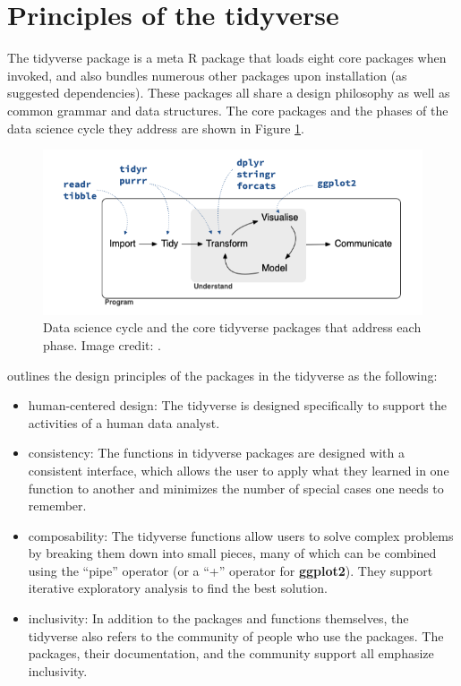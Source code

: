 \documentclass[12pt]{article}
\providecommand{\tightlist}{%
  \setlength{\itemsep}{0pt}\setlength{\parskip}{0pt}}
\begin{document}
\hypertarget{sec:principles}{%
\section{Principles of the tidyverse}\label{sec:principles}}

The tidyverse package is a meta R package that loads eight core packages
when invoked, and also bundles numerous other packages upon installation
(as suggested dependencies). These packages all share a design
philosophy as well as common grammar and data structures. The core
packages and the phases of the data science cycle they address are shown
in Figure \ref{fig:data-science-cycle}.

\linespread{1}
\begin{figure}

{\centering \includegraphics[width=0.8\linewidth]{images/data-science} 

}

\caption{Data science cycle and the core tidyverse packages that address each phase. Image credit: \cite{wickham2016r}.}\label{fig:data-science-cycle}
\end{figure}\linespread{2}
\vspace{3mm}\setlength{\parindent}{15pt}

\citet{tidyverse-style} outlines the design principles of the packages
in the tidyverse as the following:

\begin{itemize}
\tightlist
\item
  human-centered design: The tidyverse is designed specifically to
  support the activities of a human data analyst.
\item
  consistency: The functions in tidyverse packages are designed with a
  consistent interface, which allows the user to apply what they learned
  in one function to another and minimizes the number of special cases
  one needs to remember.
\item
  composability: The tidyverse functions allow users to solve complex
  problems by breaking them down into small pieces, many of which can be
  combined using the ``pipe'' operator (or a ``+'' operator for
  \textbf{ggplot2}). They support iterative exploratory analysis to find
  the best solution.
\item
  inclusivity: In addition to the packages and functions themselves, the
  tidyverse also refers to the community of people who use the packages.
  The packages, their documentation, and the community support all
  emphasize inclusivity.
\end{itemize}
\end{document}
